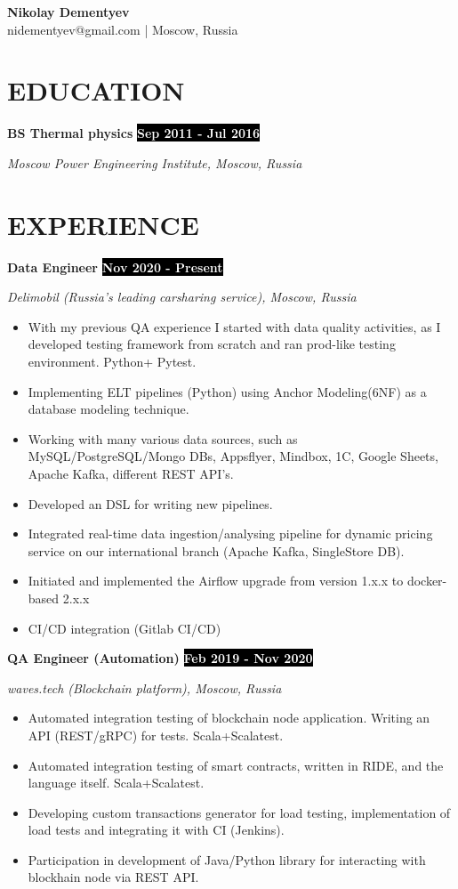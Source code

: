 \documentclass[11pt,a4paper]{article}
\newcommand{\timeperiod}[1]{%
    \hfill{\small\colorbox{black}{\textcolor{white}{\textbf{#1}}}}\par%
}
\newcommand{\jobsep}{\vspace{1.5em}}
\begin{document}
{\huge\textbf{Nikolay Dementyev}}\\[4pt]
{\normalsize nidementyev@gmail.com | Moscow, Russia}

\section{EDUCATION}
\textbf{BS Thermal physics}\timeperiod{Sep 2011 - Jul 2016}
\textit{Moscow Power Engineering Institute, Moscow, Russia}

\section{EXPERIENCE}
\textbf{Data Engineer}\timeperiod{Nov 2020 - Present}
\textit{Delimobil (Russia's leading carsharing service), Moscow, Russia}
\begin{itemize}
    \item With my previous QA experience I started with data quality activities, as I developed testing framework from scratch and ran prod-like testing environment. Python+ Pytest.
    \item Implementing ELT pipelines (Python) using Anchor Modeling(6NF) as a database modeling technique.
    \item Working with many various data sources, such as MySQL/PostgreSQL/Mongo DBs, Appsflyer, Mindbox, 1C, Google Sheets, Apache Kafka, different REST API's.
    \item Developed an DSL for writing new pipelines.
    \item Integrated real-time data ingestion/analysing pipeline for dynamic pricing service on our international branch (Apache Kafka, SingleStore DB).
    \item Initiated and implemented the Airflow upgrade from version 1.x.x to docker-based 2.x.x
    \item CI/CD integration (Gitlab CI/CD)
\end{itemize}

\jobsep
\textbf{QA Engineer (Automation)}\timeperiod{Feb 2019 - Nov 2020}
\textit{waves.tech (Blockchain platform), Moscow, Russia}
\begin{itemize}
    \item Automated integration testing of blockchain node application. Writing an API (REST/gRPC) for tests. Scala+Scalatest.
    \item Automated integration testing of smart contracts, written in RIDE, and the language itself. Scala+Scalatest.
    \item Developing custom transactions generator for load testing, implementation of load tests and integrating it with CI (Jenkins).
    \item Participation in development of Java/Python library for interacting with blockhain node via REST API.
\end{itemize}
\end{document}
